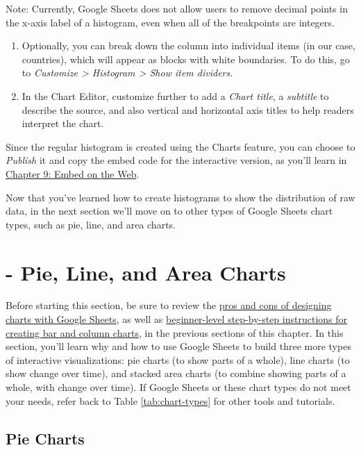 \documentclass[
  english,
]{book}
\begin{document}
Note: Currently, Google Sheets does not allow users to remove decimal points in the x-axis label of a histogram, even when all of the breakpoints are integers.

\begin{enumerate}
\def\labelenumi{\arabic{enumi}.}
\setcounter{enumi}{2}
\item
  Optionally, you can break down the column into individual items (in our case, countries), which will appear as blocks with white boundaries. To do this, go to \emph{Customize \textgreater{} Histogram \textgreater{} Show item dividers}.
\item
  In the Chart Editor, customize further to add a \emph{Chart title}, a \emph{subtitle} to describe the source, and also vertical and horizontal axis titles to help readers interpret the chart.
\end{enumerate}

Since the regular histogram is created using the Charts feature, you can choose to \emph{Publish} it and copy the embed code for the interactive version, as you'll learn in \href{embed.html}{Chapter 9: Embed on the Web}.

Now that you've learned how to create histograms to show the distribution of raw data, in the next section we'll move on to other types of Google Sheets chart types, such as pie, line, and area charts.

\hypertarget{pie-line-area-google}{%
\section*{- Pie, Line, and Area Charts}\label{pie-line-area-google}}

Before starting this section, be sure to review the \href{chart-google.html}{pros and cons of designing charts with Google Sheets}, as well as \href{bar-column-google.html}{beginner-level step-by-step instructions for creating bar and column charts}, in the previous sections of this chapter. In this section, you'll learn why and how to use Google Sheets to build three more types of interactive visualizations: pie charts (to show parts of a whole), line charts (to show change over time), and stacked area charts (to combine showing parts of a whole, with change over time). If Google Sheets or these chart types do not meet your needs, refer back to Table \ref{tab:chart-types} for other tools and tutorials.

\hypertarget{pie-charts}{%
\subsection*{Pie Charts}\label{pie-charts}}
\end{document}
